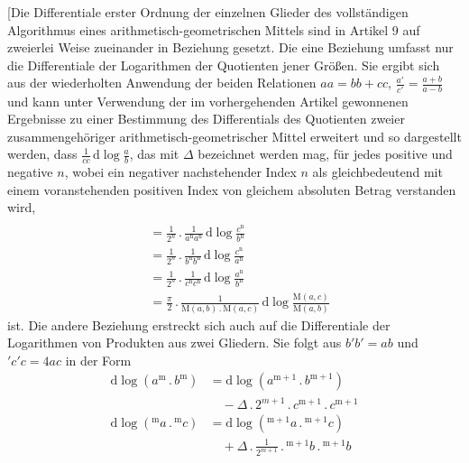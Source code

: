 \begingroup
\renewcommand{\arraystretch}{1.45}
[Die Differentiale erster Ordnung der einzelnen Glieder des vollständigen Algorithmus eines arithmetisch-geometrischen Mittels sind in Artikel 9 auf zweierlei Weise zueinander in Beziehung gesetzt. Die eine Beziehung umfasst nur die Differentiale der Logarithmen der Quotienten jener Größen. Sie ergibt sich aus der wiederholten Anwendung der beiden Relationen $aa=bb+cc$, $\frac{a'}{c'}=\frac{a+b}{a-b}$ und kann unter Verwendung der im vorhergehenden Artikel gewonnenen Ergebnisse zu einer Bestimmung des Differentials des Quotienten zweier zusammengehöriger arithmetisch-geometrischer Mittel erweitert und so dargestellt werden, dass $\frac{1}{cc}\,\mathrm{d}\log\frac{a}{b}$, das mit $\Delta$ bezeichnet werden mag, für jedes positive und negative $n$, wobei ein negativer nachstehender Index $n$ als gleichbedeutend mit einem voranstehenden positiven Index von gleichem absoluten Betrag verstanden wird,
\[
\begin{aligned}&\\&=\frac{1}{2^{n}}\mathbin{.}\frac{1}{a^{\mathrm{n}}a^{\mathrm{n}}}\,\mathrm{d}\log\frac{c^{\mathrm{n}}}{b^{\mathrm{n}}}\\&=\frac{1}{2^{n}}\mathbin{.}\frac{1}{b^{\mathrm{n}}b^{\mathrm{n}}}\,\mathrm{d}\log\frac{c^{\mathrm{n}}}{a^{\mathrm{n}}}\\&=\frac{1}{2^{n}}\mathbin{.}\frac{1}{c^{\mathrm{n}}c^{\mathrm{n}}}\,\mathrm{d}\log\frac{a^{\mathrm{n}}}{b^{\mathrm{n}}}\\&=\frac{\pi}{2}\mathbin{.}\frac{1}{\mathrm{M}(a,b)\mathbin{.}\mathrm{M}(a,c)}\,\mathrm{d}\log\frac{\mathrm{M}(a,c)}{\mathrm{M}(a,b)}\end{aligned}
\]
ist. 
Die andere Beziehung erstreckt sich auch auf die Differentiale der Logarithmen von Produkten aus zwei Gliedern. Sie folgt aus $b'b'=ab$ und ${}'c{}'c=4ac$ in der Form
\[
\begin{aligned}
\mathrm{d}\log(a^{\mathrm{m}}\mathbin{.} b^{\mathrm{m}})&=\mathrm{d}\log(a^{\mathrm{m}+1}\mathbin{.} b^{\mathrm{m}+1})\\&\quad-\Delta\mathbin{.}2^{m+1}\mathbin{.} c^{\mathrm{m}+1}\mathbin{.} c^{\mathrm{m}+1}\\[3pt]
\mathrm{d}\log({}^{\mathrm{m}}a\mathbin{.}{}^{\mathrm{m}}c)&=\mathrm{d}\log({}^{\mathrm{m}+1}a\mathbin{.}{}^{\mathrm{m}+1}c)\\&\quad+\Delta\mathbin{.}\frac{1}{2^{m+1}}\mathbin{.}{}^{\mathrm{m}+1}b\mathbin{.}{}^{\mathrm{m}+1}b
\end{aligned}
\]
